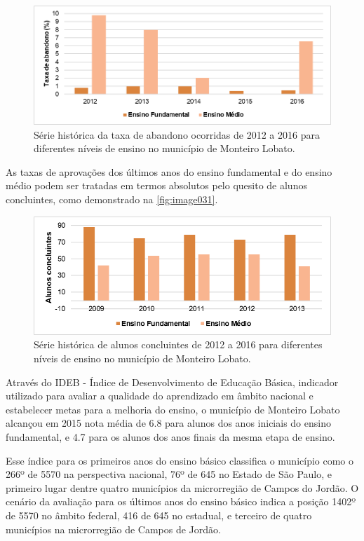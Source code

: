 \begin{figure}[h!]
	\centering
	\includegraphics[width=1\linewidth]{produtos/proddois/image030}
	\caption{Série histórica da taxa de abandono ocorridas de 2012 a 2016 para diferentes níveis de ensino no município de Monteiro Lobato.}
	\label{fig:image030}
\end{figure}
\clearpage

As taxas de aprovações dos últimos anos do ensino fundamental e do ensino médio podem ser tratadas em termos absolutos pelo quesito de alunos concluintes, como demonstrado na \autoref{fig:image031}.

\begin{figure}[h!]
	\centering
	\includegraphics[width=1\linewidth]{produtos/proddois/image031}
	\caption{Série histórica de alunos concluintes de 2012 a 2016 para diferentes níveis de ensino no município de Monteiro Lobato.}
	\label{fig:image031}
\end{figure}

Através do IDEB - Índice de Desenvolvimento de Educação Básica, indicador utilizado para avaliar a qualidade do aprendizado em âmbito nacional e estabelecer metas para a melhoria do ensino, o município de Monteiro Lobato alcançou em 2015 nota média de 6.8 para alunos dos anos iniciais do ensino fundamental, e 4.7 para os alunos dos anos finais da mesma etapa de ensino.

Esse índice para os primeiros anos do ensino básico classifica o município como o 266º de 5570 na perspectiva nacional, 76º de 645 no Estado de São Paulo, e primeiro lugar dentre quatro municípios da microrregião de Campos do Jordão. O cenário da avaliação para os últimos anos do ensino básico indica a posição 1402º de 5570 no âmbito federal, 416 de 645 no estadual, e terceiro de quatro municípios na microrregião de Campos de Jordão.
	

